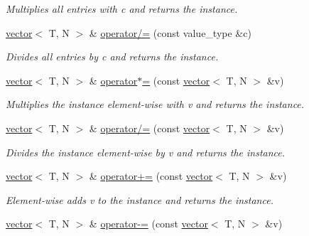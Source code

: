 \begin{DoxyCompactItemize}
\begin{DoxyCompactList}\small\item\em Multiplies all entries with c and returns the instance. \end{DoxyCompactList}\item 
\hypertarget{a00559_ab47eed5c602095956c2c91c290e44dcf}{\hyperlink{a00559}{vector}$<$ T, N $>$ \& \hyperlink{a00559_ab47eed5c602095956c2c91c290e44dcf}{operator/=} (const value\-\_\-type \&c)}\label{a00559_ab47eed5c602095956c2c91c290e44dcf}

\begin{DoxyCompactList}\small\item\em Divides all entries by c and returns the instance. \end{DoxyCompactList}\item 
\hypertarget{a00559_ad99ef7ae4880f5c79045fa7199a6bc1a}{\hyperlink{a00559}{vector}$<$ T, N $>$ \& \hyperlink{a00559_ad99ef7ae4880f5c79045fa7199a6bc1a}{operator$\ast$=} (const \hyperlink{a00559}{vector}$<$ T, N $>$ \&v)}\label{a00559_ad99ef7ae4880f5c79045fa7199a6bc1a}

\begin{DoxyCompactList}\small\item\em Multiplies the instance element-\/wise with v and returns the instance. \end{DoxyCompactList}\item 
\hypertarget{a00559_a506e4f2819fa020e13db64fcd5499c86}{\hyperlink{a00559}{vector}$<$ T, N $>$ \& \hyperlink{a00559_a506e4f2819fa020e13db64fcd5499c86}{operator/=} (const \hyperlink{a00559}{vector}$<$ T, N $>$ \&v)}\label{a00559_a506e4f2819fa020e13db64fcd5499c86}

\begin{DoxyCompactList}\small\item\em Divides the instance element-\/wise by v and returns the instance. \end{DoxyCompactList}\item 
\hypertarget{a00559_aae493dbdfc552c750f0f9285b19da798}{\hyperlink{a00559}{vector}$<$ T, N $>$ \& \hyperlink{a00559_aae493dbdfc552c750f0f9285b19da798}{operator+=} (const \hyperlink{a00559}{vector}$<$ T, N $>$ \&v)}\label{a00559_aae493dbdfc552c750f0f9285b19da798}

\begin{DoxyCompactList}\small\item\em Element-\/wise adds v to the instance and returns the instance. \end{DoxyCompactList}\item 
\hypertarget{a00559_a87d35ac1282c34e5e0d09d27a50c872d}{\hyperlink{a00559}{vector}$<$ T, N $>$ \& \hyperlink{a00559_a87d35ac1282c34e5e0d09d27a50c872d}{operator-\/=} (const \hyperlink{a00559}{vector}$<$ T, N $>$ \&v)}\label{a00559_a87d35ac1282c34e5e0d09d27a50c872d}


\end{DoxyCompactItemize}
